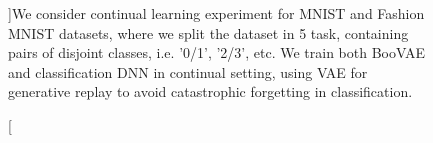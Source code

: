 \begin{figure}[t]
	\centering
		\caption[][\baselineskip]{We consider continual learning experiment for MNIST and Fashion MNIST datasets, where we split the dataset in 5 task, containing pairs of disjoint classes, i.e.  '0/1', '2/3', etc. We train both BooVAE and classification DNN in continual setting, using VAE for generative replay to avoid catastrophic forgetting in classification.}
		\label{fig:gen_relpay}
	\vspace*{\baselineskip}
\end{figure}


